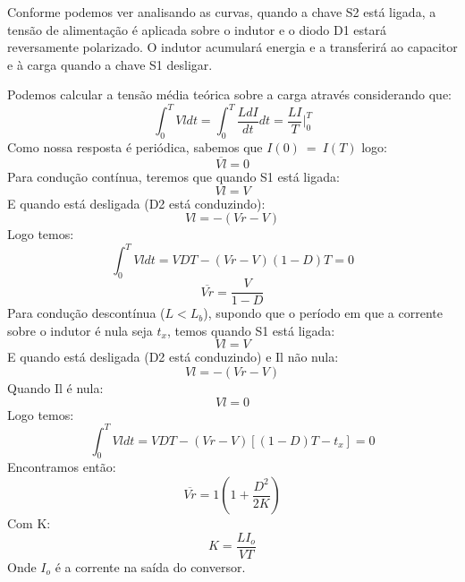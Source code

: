 \documentclass{article}
\begin{document}
Conforme podemos ver analisando as curvas, quando a chave S2 está ligada, a tensão de alimentação é aplicada sobre o indutor e o diodo D1 estará reversamente polarizado. O indutor acumulará energia e a transferirá ao capacitor e à carga quando a chave S1 desligar.

Podemos calcular a tensão média teórica sobre a carga através considerando que:
\begin{equation}
\int_{0}^{T}Vl dt = \int_{0}^{T}\frac{LdI}{dt} dt = \frac{LI}{T}\bigg\rvert_0^T
\end{equation}
Como nossa resposta é periódica, sabemos que $I(0)\ =\ I(T)$ logo:
\begin{equation}
\overline{Vl} = 0
\end{equation}
Para condução contínua, teremos que quando S1 está ligada:
\begin{equation}
	Vl = V
\end{equation}
E quando está desligada (D2 está conduzindo):
\begin{equation}
	Vl = -(Vr - V)
\end{equation}
Logo temos:
\begin{equation}
	\int_{0}^{T}Vl dt = VDT - (Vr - V)(1 - D)T = 0
\end{equation}
\begin{equation}
\overline{Vr} = \frac{V}{1 - D}
\end{equation}
Para condução descontínua ($L < L_b$), supondo que o período em que a corrente sobre o indutor é nula seja $t_x$, temos quando S1 está ligada:
\begin{equation}
Vl = V
\end{equation}
E quando está desligada (D2 está conduzindo) e Il não nula:
\begin{equation}
Vl = -(Vr - V)
\end{equation}
Quando Il é nula:
\begin{equation}
Vl = 0
\end{equation}
Logo temos:
\begin{equation}
\int_{0}^{T}Vl dt = VDT - (Vr - V)[(1 - D)T - t_x] = 0
\end{equation}
Encontramos então:
\begin{equation}
\overline{Vr} = 1(1 + \frac{D^2}{2K})
\end{equation}
Com K:
\begin{equation}
	K = \frac{LI_o}{VT}
\end{equation}
Onde $I_o$ é a corrente na saída do conversor.
\end{document}

